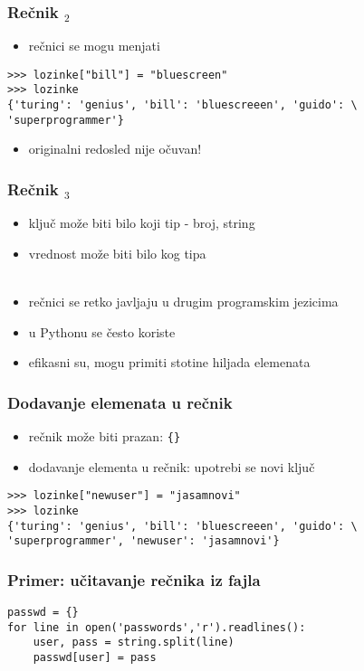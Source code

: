 \documentclass[utf8,compress,aspectratio=169]{beamer}
\begin{document}
\begin{frame}[fragile]
  \frametitle{Rečnik $_2$}
  \begin{itemize}
    \item rečnici se mogu menjati
  \end{itemize}
\begin{verbatim}
>>> lozinke["bill"] = "bluescreen"
>>> lozinke
{'turing': 'genius', 'bill': 'bluescreeen', 'guido': \
'superprogrammer'}
\end{verbatim}
  \begin{itemize}
    \item originalni redosled nije očuvan!
  \end{itemize}
\end{frame}

\begin{frame}[fragile]
  \frametitle{Rečnik $_3$}
  \begin{itemize}
    \item ključ može biti bilo koji  tip - broj, string
    \item vrednost može biti bilo kog tipa \\ \ \\
    \item rečnici se retko javljaju u drugim programskim jezicima
    \item u Pythonu se često koriste
    \item efikasni su, mogu primiti stotine hiljada elemenata
  \end{itemize}
\end{frame}

\begin{frame}[fragile]
  \frametitle{Dodavanje elemenata u rečnik}
  \begin{itemize}
    \item rečnik može biti prazan: \texttt{\{\}}
    \item dodavanje elementa u rečnik: upotrebi se novi ključ
  \end{itemize}
\begin{verbatim}
>>> lozinke["newuser"] = "jasamnovi"
>>> lozinke
{'turing': 'genius', 'bill': 'bluescreeen', 'guido': \
'superprogrammer', 'newuser': 'jasamnovi'}
\end{verbatim}
\end{frame}

\begin{frame}[fragile]
  \frametitle{Primer: učitavanje rečnika iz fajla}
\begin{verbatim}
passwd = {}
for line in open('passwords','r').readlines():
    user, pass = string.split(line)
    passwd[user] = pass
\end{verbatim}
\end{frame}
\end{document}
